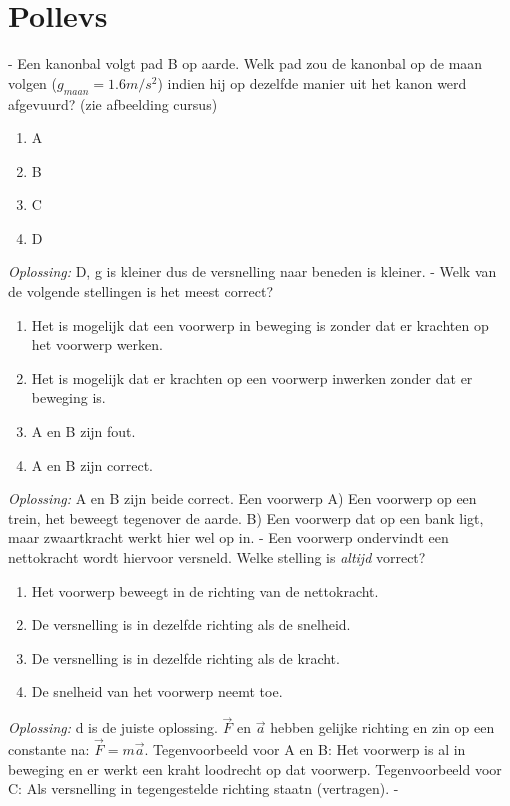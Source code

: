 \documentclass[12pt,a4paper]{article}
\begin{document}
	\section{Pollevs}
	- Een kanonbal volgt pad B op aarde. Welk pad zou de kanonbal op de maan volgen (\(g_{maan} = 1.6m/s^2\)) indien hij op dezelfde manier uit het kanon werd afgevuurd? (zie afbeelding cursus)
	\begin{enumerate}[label=\alph*)]
		\item A
		\item B
		\item C
		\item D
	\end{enumerate}
	\textit{Oplossing:} D, g is kleiner dus de versnelling naar beneden is kleiner. 
	\newline
	- Welk van de volgende stellingen is het meest correct?
	\begin{enumerate}[label=\alph*]
		\item Het is mogelijk dat een voorwerp in beweging is zonder dat er krachten op het voorwerp werken.
		\item Het is mogelijk dat er krachten op een voorwerp inwerken zonder dat er beweging is. 
		\item A en B zijn fout.
		\item A en B zijn correct.  
	\end{enumerate}
	\textit{Oplossing:} A en B zijn beide correct. Een voorwerp A) Een voorwerp op een trein, het beweegt tegenover de aarde. B) Een voorwerp dat op een bank ligt, maar zwaartkracht werkt hier wel op in. 
	- Een voorwerp ondervindt een nettokracht wordt hiervoor versneld. Welke stelling is \textit{altijd} vorrect? 
	\begin{enumerate}[label=\alph*]
		\item Het voorwerp beweegt in de richting van de nettokracht. 
		\item De versnelling is in dezelfde richting als de snelheid. 
		\item De versnelling is in dezelfde richting als de kracht. 
		\item De snelheid van het voorwerp neemt toe. 
	\end{enumerate}
	\textit{Oplossing:} d is de juiste oplossing. $\vec{F}$ en $\vec{a}$ hebben gelijke richting en zin op een constante na: \(\vec{F} = m\vec{a}\). Tegenvoorbeeld voor A en B: Het voorwerp is al in beweging en er werkt een kraht loodrecht op dat voorwerp. Tegenvoorbeeld voor C: Als versnelling in tegengestelde richting staatn (vertragen).
	- 
	\newpage
	
\end{document}

